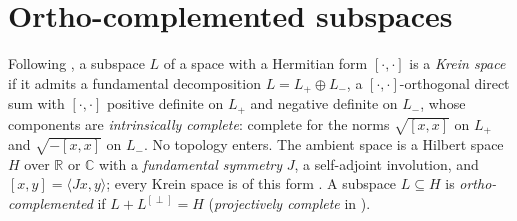 \section{Ortho-complemented subspaces}

\begin{definition}
  \label{def:kr-krein}
  \leanok
  Following \cite[\S I.11, \S III.8, \S V.1]{Bog74}, a subspace $L$ of a space with a Hermitian form
  $[\cdot, \cdot]$ is a \emph{Krein space} if it admits a fundamental decomposition
  $L = L_+ \oplus L_-$, a $[\cdot, \cdot]$-orthogonal direct sum with $[\cdot, \cdot]$ positive
  definite on $L_+$ and negative definite on $L_-$, whose components are \emph{intrinsically
  complete}: complete for the norms $\sqrt{[x, x]}$ on $L_+$ and $\sqrt{-[x, x]}$ on $L_-$. No
  topology enters. The ambient space is a Hilbert space $H$ over $\mathbb{R}$ or $\mathbb{C}$ with a
  \emph{fundamental symmetry} $J$, a self-adjoint involution, and $[x, y] = \langle Jx, y\rangle$;
  every Krein space is of this form \cite[Corollary~V.1.2]{Bog74}. A subspace $L \subseteq H$ is
  \emph{ortho-complemented} if $L + L^{[\perp]} = H$ \cite[\S I.9, p.~18]{Bog74}
  (\emph{projectively complete} in \cite[Definition~1.7.8]{AI89}).
\end{definition}

